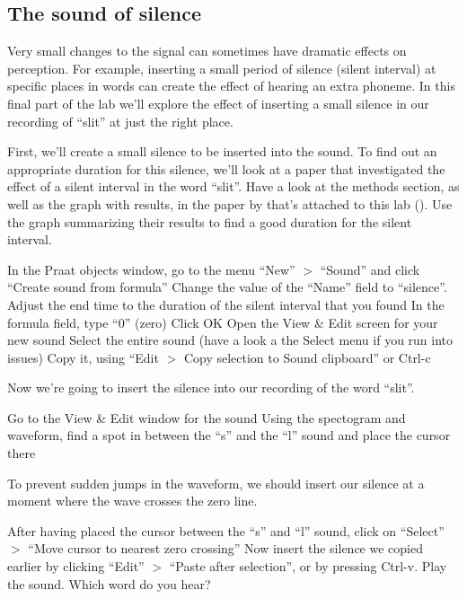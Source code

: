 \documentclass[a4paper, 9pt]{article}
\begin{document}
\subsection{The sound of silence}\label{the-sound-of-silence}

Very small changes to the signal can sometimes have dramatic effects on
perception. For example, inserting a small period of silence (silent
interval) at specific places in words can create the effect of hearing
an extra phoneme. In this final part of the lab we'll explore the effect
of inserting a small silence in our recording of ``slit'' at just the
right place.

First, we'll create a small silence to be inserted into the
 sound. To find out an appropriate duration for this
silence, we'll look at a paper that investigated the effect of a silent
interval in the word ``slit''. Have a look at the methods section, as
well as the graph with results, in the paper by \cite{Marcus1978} that's
attached to this lab (). Use the graph summarizing their
results to find a good duration for the silent interval.

\begin{exercise}
\action In the Praat objects window, go to the menu ``New'' $>$ ``Sound'' and click ``Create sound from formula''
\action Change the value of the ``Name'' field to ``silence''. 
\action Adjust the end time to the duration of the silent interval that you found
\action In the formula field, type ``0'' (zero)
\action Click OK
\action Open the View \& Edit screen for your new sound
\action Select the entire sound (have a look a the Select menu if you run into issues)
\action Copy it, using ``Edit $>$ Copy selection to Sound clipboard'' or Ctrl-c
\end{exercise}

Now we're going to insert the silence into our recording of the word
``slit''.

\begin{exercise}
\action Go to the View \& Edit window for the sound 
\action Using the spectogram and waveform, find a spot in between the ``s'' and the ``l'' sound and place the cursor there
\end{exercise}

To prevent sudden jumps in the waveform, we should insert our silence at
a moment where the wave crosses the zero line.

\begin{exercise}
\action After having placed the cursor between the ``s'' and ``l'' sound, click on ``Select'' $>$ ``Move cursor to nearest zero crossing''
\action Now insert the silence we copied earlier by clicking ``Edit'' $>$ ``Paste after selection'', or by pressing Ctrl-v.
\action Play the sound. Which word do you hear?
\end{exercise}

\printbibliography
\end{document}
